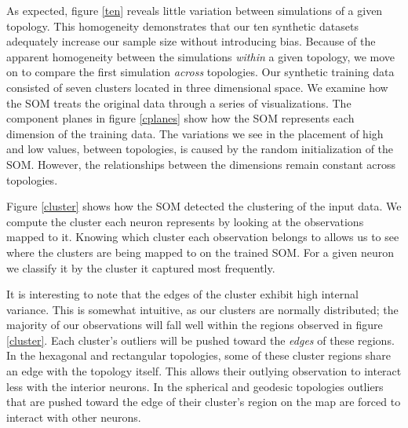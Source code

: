 As expected, figure \ref{ten} reveals little variation 
between simulations of a given topology.  This homogeneity demonstrates that
our ten synthetic datasets adequately increase our sample size without introducing bias.  
Because of the apparent homogeneity between the simulations \emph{within} a
given topology, we move on to compare the first simulation \emph{across} topologies.  
Our synthetic training data consisted of seven clusters located in three
dimensional space. We examine how the SOM treats the original data through a
series of visualizations.  The component planes in figure \ref{cplanes} show
how the SOM represents each dimension of the training data.  The variations we
see in the placement of high and low values, between topologies, is caused by
the random initialization of the SOM.  However, the relationships between the
dimensions remain constant across topologies. 

Figure \ref{cluster} shows how the SOM detected the clustering of the input
data.  We compute the cluster each neuron represents by looking at the
observations mapped to it.  Knowing which cluster each observation belongs to
allows us to see where the clusters are being mapped to on the trained SOM. For a
given neuron we classify it by the cluster it captured most frequently. 

It is interesting to note that the edges of the cluster exhibit high internal variance.  
This is somewhat intuitive, as our clusters are normally distributed; the
majority of our observations will fall well within the regions observed in
figure \ref{cluster}. Each cluster's outliers will be pushed toward the
\emph{edges} of these regions. In the hexagonal and rectangular topologies,
some of these cluster regions share an edge with the topology itself.  This
allows their outlying observation to interact less with the interior neurons.
In the spherical and geodesic topologies outliers that are pushed toward the edge of
their cluster's region on the map are forced to interact with other neurons.



